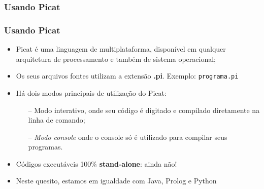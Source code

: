\subsubsection{Usando Picat}

\begin{frame}[fragile]
  \frametitle{Usando Picat}
  	\begin{itemize}
    
      \item Picat é uma linguagem de multiplataforma, disponível em qualquer arquitetura de 
      processamento e também de sistema operacional;
      \item Os seus arquivos fontes utilizam a extensão \textbf{.pi}. Exemplo: \texttt{programa.pi}
      \item Há dois modos principais de utilização do Picat: 
      
      \begin{itemize}
      	\item[--] Modo interativo, onde seu código é digitado e compilado diretamente na linha de 
        comando;
      	\item[--] \textit{Modo console} onde o console só é utilizado para compilar seus programas.
      \end{itemize}
      
      \item Códigos executáveis 100\% \textbf{stand-alone}: ainda não!
      \item Neste quesito, estamos em igualdade com Java, Prolog e Python
     
    \end{itemize}
\end{frame}


